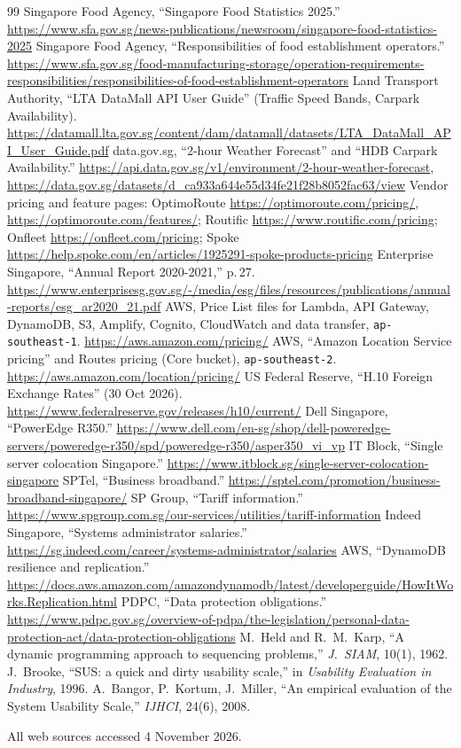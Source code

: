 \documentclass[10.5pt,a4paper]{article}
\begin{document}
\begin{thebibliography}{99}\setlength{\itemsep}{0pt}
 Singapore Food Agency, ``Singapore Food Statistics 2025.'' \url{https://www.sfa.gov.sg/news-publications/newsroom/singapore-food-statistics-2025}
 Singapore Food Agency, ``Responsibilities of food establishment operators.'' \url{https://www.sfa.gov.sg/food-manufacturing-storage/operation-requirements-responsibilities/responsibilities-of-food-establishment-operators}
 Land Transport Authority, ``LTA DataMall API User Guide'' (Traffic Speed Bands, Carpark Availability). \url{https://datamall.lta.gov.sg/content/dam/datamall/datasets/LTA_DataMall_API_User_Guide.pdf}
 data.gov.sg, ``2-hour Weather Forecast'' and ``HDB Carpark Availability.'' \url{https://api.data.gov.sg/v1/environment/2-hour-weather-forecast}, \url{https://data.gov.sg/datasets/d_ca933a644e55d34fe21f28b8052fac63/view}
 Vendor pricing and feature pages: OptimoRoute \url{https://optimoroute.com/pricing/}, \url{https://optimoroute.com/features/}; Routific \url{https://www.routific.com/pricing}; Onfleet \url{https://onfleet.com/pricing}; Spoke \url{https://help.spoke.com/en/articles/1925291-spoke-products-pricing}
 Enterprise Singapore, ``Annual Report 2020-2021,'' p.\,27. \url{https://www.enterprisesg.gov.sg/-/media/esg/files/resources/publications/annual-reports/esg_ar2020_21.pdf}
 AWS, Price List files for Lambda, API Gateway, DynamoDB, S3, Amplify, Cognito, CloudWatch and data transfer, \texttt{ap-southeast-1}. \url{https://aws.amazon.com/pricing/}
 AWS, ``Amazon Location Service pricing'' and Routes pricing (Core bucket), \texttt{ap-southeast-2}. \url{https://aws.amazon.com/location/pricing/}
 US Federal Reserve, ``H.10 Foreign Exchange Rates'' (30 Oct 2026). \url{https://www.federalreserve.gov/releases/h10/current/}
 Dell Singapore, ``PowerEdge R350.'' \url{https://www.dell.com/en-sg/shop/dell-poweredge-servers/poweredge-r350/spd/poweredge-r350/asper350_vi_vp}
 IT Block, ``Single server colocation Singapore.'' \url{https://www.itblock.sg/single-server-colocation-singapore}
 SPTel, ``Business broadband.'' \url{https://sptel.com/promotion/business-broadband-singapore/}
 SP Group, ``Tariff information.'' \url{https://www.spgroup.com.sg/our-services/utilities/tariff-information}
 Indeed Singapore, ``Systems administrator salaries.'' \url{https://sg.indeed.com/career/systems-administrator/salaries}
 AWS, ``DynamoDB resilience and replication.'' \url{https://docs.aws.amazon.com/amazondynamodb/latest/developerguide/HowItWorks.Replication.html}
 PDPC, ``Data protection obligations.'' \url{https://www.pdpc.gov.sg/overview-of-pdpa/the-legislation/personal-data-protection-act/data-protection-obligations}
 M.~Held and R.~M.~Karp, ``A dynamic programming approach to sequencing problems,'' \emph{J.\ SIAM}, 10(1), 1962.
 J.~Brooke, ``SUS: a quick and dirty usability scale,'' in \emph{Usability Evaluation in Industry}, 1996.
 A.~Bangor, P.~Kortum, J.~Miller, ``An empirical evaluation of the System Usability Scale,'' \emph{IJHCI}, 24(6), 2008.
\end{thebibliography}
\normalsize
\footnotesize All web sources accessed 4 November 2026.
\end{document}
